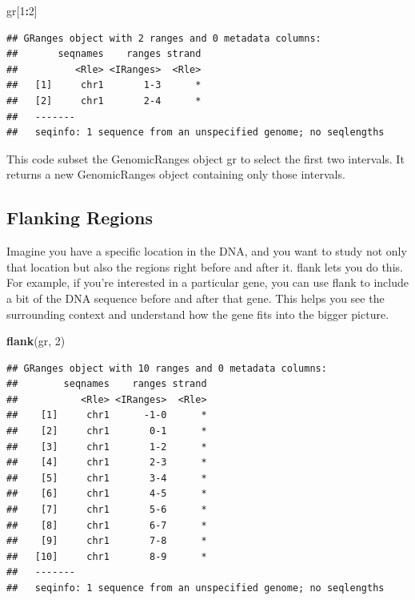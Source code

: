 \documentclass[
]{book}
\newenvironment{Shaded}{\begin{snugshade}}{\end{snugshade}}
\newcommand{\DecValTok}[1]{\textcolor[rgb]{0.00,0.00,0.81}{#1}}
\newcommand{\FunctionTok}[1]{\textcolor[rgb]{0.13,0.29,0.53}{\textbf{#1}}}
\newcommand{\NormalTok}[1]{#1}
\newcommand{\SpecialCharTok}[1]{\textcolor[rgb]{0.81,0.36,0.00}{\textbf{#1}}}
\begin{document}
\begin{Shaded}
\begin{Highlighting}[]
\NormalTok{gr[}\DecValTok{1}\SpecialCharTok{:}\DecValTok{2}\NormalTok{]}
\end{Highlighting}
\end{Shaded}

\begin{verbatim}
## GRanges object with 2 ranges and 0 metadata columns:
##       seqnames    ranges strand
##          <Rle> <IRanges>  <Rle>
##   [1]     chr1       1-3      *
##   [2]     chr1       2-4      *
##   -------
##   seqinfo: 1 sequence from an unspecified genome; no seqlengths
\end{verbatim}

This code subset the GenomicRanges object gr to select the first two intervals. It returns a new GenomicRanges object containing only those intervals.

\hypertarget{flanking-regions}{%
\subsection{Flanking Regions}\label{flanking-regions}}

Imagine you have a specific location in the DNA, and you want to study not only that location but also the regions right before and after it. flank lets you do this. For example, if you're interested in a particular gene, you can use flank to include a bit of the DNA sequence before and after that gene. This helps you see the surrounding context and understand how the gene fits into the bigger picture.

\begin{Shaded}
\begin{Highlighting}[]
\FunctionTok{flank}\NormalTok{(gr, }\DecValTok{2}\NormalTok{)}
\end{Highlighting}
\end{Shaded}

\begin{verbatim}
## GRanges object with 10 ranges and 0 metadata columns:
##        seqnames    ranges strand
##           <Rle> <IRanges>  <Rle>
##    [1]     chr1      -1-0      *
##    [2]     chr1       0-1      *
##    [3]     chr1       1-2      *
##    [4]     chr1       2-3      *
##    [5]     chr1       3-4      *
##    [6]     chr1       4-5      *
##    [7]     chr1       5-6      *
##    [8]     chr1       6-7      *
##    [9]     chr1       7-8      *
##   [10]     chr1       8-9      *
##   -------
##   seqinfo: 1 sequence from an unspecified genome; no seqlengths
\end{verbatim}
\end{document}
